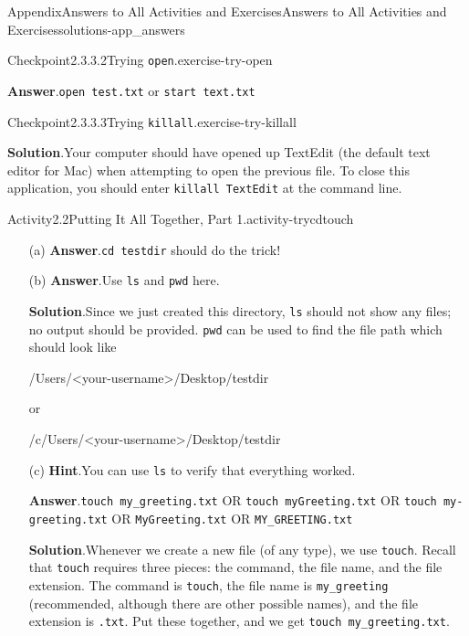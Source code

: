 \documentclass[oneside,10pt,]{book}
\newcommand{\blocktitlefont}{\relax}
\newcommand{\mono}[1]{\texttt{#1}}
\begin{document}
\begin{solutions-chapter}{Appendix}{Answers to All Activities and Exercises}{}{Answers to All Activities and Exercises}{}{}{solutions-app_answers}
\begin{inlinesolution}{Checkpoint}{2.3.3.2}{Trying \mono{open}.}{exercise-try-open}
\par\smallskip%
\noindent\textbf{\blocktitlefont Answer}.\hypertarget{answer-try-open-c-back}{}\quad{}\mono{open test.txt} or \mono{start text.txt}%
\end{inlinesolution}%
\begin{inlinesolution}{Checkpoint}{2.3.3.3}{Trying \mono{killall}.}{exercise-try-killall}%
\par\smallskip%
\noindent\textbf{\blocktitlefont Solution}.\hypertarget{solution-try-killall-c-back}{}\quad{}Your computer should have opened up TextEdit (the default text editor for Mac) when attempting to open the previous file. To close this application, you should enter \mono{killall TextEdit} at the command line.%
\end{inlinesolution}%
\begin{activitysolution}{Activity}{2.2}{Putting It All Together, Part 1.}{activity-trycdtouch}%
\begin{enumerate}[font=\bfseries,label=(\alph*),ref=\alph*]%
\item[(a)]\noindent\textbf{\blocktitlefont Answer}.\hypertarget{answer-trycdtouch-d-b-back}{}\quad{}\mono{cd testdir} should do the trick!%
\item[(b)]\noindent\textbf{\blocktitlefont Answer}.\hypertarget{answer-trycdtouch-e-b-back}{}\quad{}Use \mono{ls} and \mono{pwd} here.%
\par\smallskip%
\noindent\textbf{\blocktitlefont Solution}.\hypertarget{solution-trycdtouch-e-c-back}{}\quad{}Since we just created this directory, \mono{ls} should not show any files; no output should be provided. \mono{pwd} can be used to find the file path which should look like%
\begin{codedisplay}
/Users/<your-username>/Desktop/testdir
\end{codedisplay}
or%
\begin{codedisplay}
/c/Users/<your-username>/Desktop/testdir
\end{codedisplay}
%
\item[(c)]\noindent\textbf{\blocktitlefont Hint}.\hypertarget{hint-trycdtouch-f-b-back}{}\quad{}You can use \mono{ls} to verify that everything worked.%
\par\smallskip%
\noindent\textbf{\blocktitlefont Answer}.\hypertarget{answer-trycdtouch-f-c-back}{}\quad{}\mono{touch my\_greeting.txt} OR \mono{touch myGreeting.txt} OR \mono{touch my-greeting.txt} OR \mono{MyGreeting.txt} OR \mono{MY\_GREETING.txt}%
\par\smallskip%
\noindent\textbf{\blocktitlefont Solution}.\hypertarget{solution-trycdtouch-f-d-back}{}\quad{}Whenever we create a new file (of any type), we use \mono{touch}. Recall that \mono{touch} requires three pieces: the command, the file name, and the file extension. The command is \mono{touch}, the file name is \mono{my\_greeting} (recommended, although there are other possible names), and the file extension is \mono{.txt}. Put these together, and we get \mono{touch my\_greeting.txt}.%

\end{enumerate}
\end{activitysolution}
\end{solutions-chapter}
\end{document}
